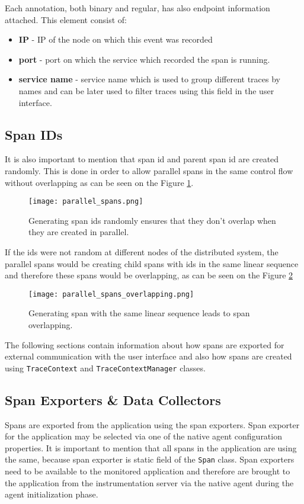 Each annotation, both binary and regular, has also endpoint information attached. This element consist of:
\begin{itemize}
	\item \textbf{IP} - IP of the node on which this event was recorded
	\item \textbf{port} - port on which the service which recorded the span is running.
	\item \textbf{service name} - service name which is used to group different traces by names and can be later used to filter traces using this field in the user interface.
\end{itemize}

\subsection{Span IDs}
It is also important to mention that span id and parent span id are created randomly. This is done in order to allow parallel spans in the same control flow without overlapping as can be seen on the Figure \ref{fig:parallel_spans}.

	\begin{figure}
		\centering
		\texttt{[image: parallel\_spans.png]}
		\caption{Generating span ids randomly ensures that they don't overlap when they are created in parallel.}
		\label{fig:parallel_spans}
	\end{figure}
If the ids were not random at different nodes of the distributed system, the parallel spans would be creating child spans with ids in the same linear sequence and therefore these spans would be overlapping, as can be seen on the Figure \ref{fig:parallel_spans_overlapping}
	\begin{figure}
		\centering
		\texttt{[image: parallel\_spans\_overlapping.png]}
		\caption{Generating span with the same linear sequence leads to span overlapping.}
		\label{fig:parallel_spans_overlapping}
	\end{figure}
	
The following sections contain information about how spans are exported for external communication with the user interface and also how spans are created using \texttt{TraceContext} and \texttt{TraceContextManager} classes.
\subsection{Span Exporters \& Data Collectors}
Spans are exported from the application using the span exporters. Span exporter for the application may be selected via one of the native agent configuration properties. It is important to mention that all spans in the application are using the same, because span exporter is static field of the \texttt{Span} class. Span exporters need to be available to the monitored application and therefore are brought to the application from the instrumentation server via the native agent during the agent initialization phase.

